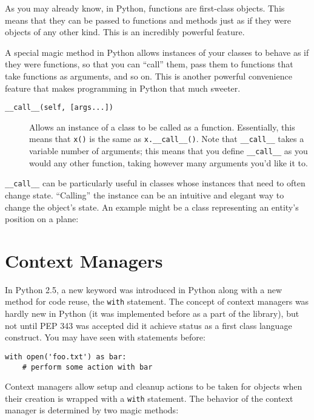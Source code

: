 \documentclass[a4paper,11pt]{article}
\newcommand{\code}[1]{\texttt{#1}}
\begin{document}
As you may already know, in Python, functions are first-class objects. This means that they can be passed to functions and methods just as if they were objects of any other kind. This is an incredibly powerful feature.

A special magic method in Python allows instances of your classes to behave as if they were functions, so that you can ``call'' them, pass them to functions that take functions as arguments, and so on. This is another powerful convenience feature that makes programming in Python that much sweeter.

\begin{description}

\item[\code{__call__(self, [args...])}]
Allows an instance of a class to be called as a function. Essentially, this means that \code{x()} is the same as \code{x.__call__()}. Note that \code{__call__} takes a variable number of arguments; this means that you define \code{__call__} as you would any other function, taking however many arguments you'd like it to.

\end{description}

\code{__call__} can be particularly useful in classes whose instances that need to often change state. ``Calling'' the instance can be an intuitive and elegant way to change the object's state. An example might be a class representing an entity's position on a plane:



\section{Context Managers}

In Python 2.5, a new keyword was introduced in Python along with a new method for code reuse, the \code{with} statement. The concept of context managers was hardly new in Python (it was implemented before as a part of the library), but not until PEP 343 was accepted did it achieve status as a first class language construct. You may have seen with statements before:

\begin{lstlisting}   
with open('foo.txt') as bar:
    # perform some action with bar
\end{lstlisting}
        
Context managers allow setup and cleanup actions to be taken for objects when their creation is wrapped with a \code{with} statement. The behavior of the context manager is determined by two magic methods:
\end{document}
